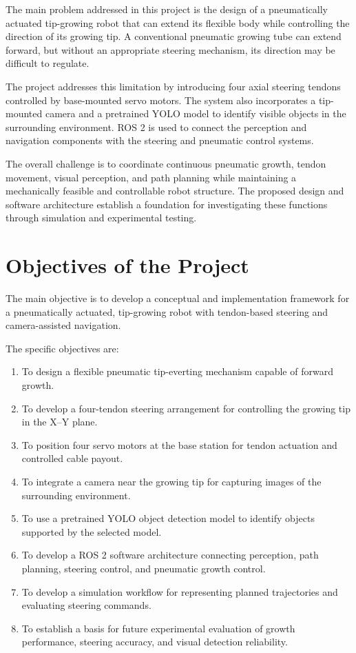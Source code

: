 The main problem addressed in this project is the design of a pneumatically actuated tip-growing robot that can extend its flexible body while controlling the direction of its growing tip. A conventional pneumatic growing tube can extend forward, but without an appropriate steering mechanism, its direction may be difficult to regulate.

The project addresses this limitation by introducing four axial steering tendons controlled by base-mounted servo motors. The system also incorporates a tip-mounted camera and a pretrained YOLO model to identify visible objects in the surrounding environment. ROS 2 is used to connect the perception and navigation components with the steering and pneumatic control systems.

The overall challenge is to coordinate continuous pneumatic growth, tendon movement, visual perception, and path planning while maintaining a mechanically feasible and controllable robot structure. The proposed design and software architecture establish a foundation for investigating these functions through simulation and experimental testing.

\section{Objectives of the Project}

The main objective is to develop a conceptual and implementation framework for a pneumatically actuated, tip-growing robot with tendon-based steering and camera-assisted navigation.

The specific objectives are:

\begin{enumerate}
    \item To design a flexible pneumatic tip-everting mechanism capable of forward growth.
    \item To develop a four-tendon steering arrangement for controlling the growing tip in the X--Y plane.
    \item To position four servo motors at the base station for tendon actuation and controlled cable payout.
    \item To integrate a camera near the growing tip for capturing images of the surrounding environment.
    \item To use a pretrained YOLO object detection model to identify objects supported by the selected model.
    \item To develop a ROS 2 software architecture connecting perception, path planning, steering control, and pneumatic growth control.
    \item To develop a simulation workflow for representing planned trajectories and evaluating steering commands.
    \item To establish a basis for future experimental evaluation of growth performance, steering accuracy, and visual detection reliability.
\end{enumerate}

